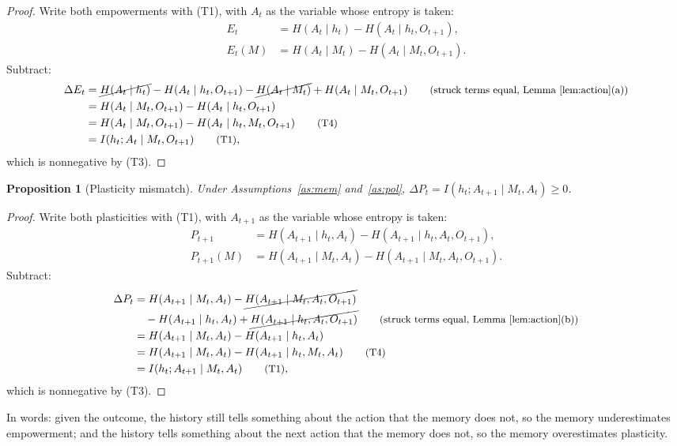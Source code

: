 \documentclass{article}
\newtheorem{proposition}{Proposition}[section]
\theoremstyle{definition}
\theoremstyle{remark}
\newcommand{\dE}{\Delta E}
\newcommand{\dP}{\Delta P}
\newcommand{\why}[1]{\tag*{\small(#1)}}
\begin{document}
\begin{proof}
Write both empowerments with (T1), with $A_t$ as the variable whose entropy is taken:
\begin{align*}
E_t&=H(A_t\mid h_t)-H(A_t\mid h_t,O_{t+1}),\\
E_t(M)&=H(A_t\mid M_t)-H(A_t\mid M_t,O_{t+1}).
\end{align*}
Subtract:
\begin{align*}
\dE_t&=\cancel{H(A_t\mid h_t)}-H(A_t\mid h_t,O_{t+1})-\cancel{H(A_t\mid M_t)}+H(A_t\mid M_t,O_{t+1}) \why{struck terms equal, Lemma~\ref{lem:action}(a)}\\
&=H(A_t\mid M_t,O_{t+1})-H(A_t\mid h_t,O_{t+1})\\
&=H(A_t\mid M_t,O_{t+1})-H(A_t\mid h_t,M_t,O_{t+1}) \why{T4}\\
&=I(h_t;A_t\mid M_t,O_{t+1}) \why{T1},
\end{align*}
which is nonnegative by (T3).
\end{proof}

\begin{proposition}[Plasticity mismatch]\label{prop:dP}
Under Assumptions~\ref{as:mem} and~\ref{as:pol}, $\dP_t=I(h_t;A_{t+1}\mid M_t,A_t)\ge0$.
\end{proposition}

\begin{proof}
Write both plasticities with (T1), with $A_{t+1}$ as the variable whose entropy is taken:
\begin{align*}
P_{t+1}&=H(A_{t+1}\mid h_t,A_t)-H(A_{t+1}\mid h_t,A_t,O_{t+1}),\\
P_{t+1}(M)&=H(A_{t+1}\mid M_t,A_t)-H(A_{t+1}\mid M_t,A_t,O_{t+1}).
\end{align*}
Subtract:
\begin{align*}
\dP_t&=H(A_{t+1}\mid M_t,A_t)-\cancel{H(A_{t+1}\mid M_t,A_t,O_{t+1})}\\
&\quad-H(A_{t+1}\mid h_t,A_t)+\cancel{H(A_{t+1}\mid h_t,A_t,O_{t+1})} \why{struck terms equal, Lemma~\ref{lem:action}(b)}\\
&=H(A_{t+1}\mid M_t,A_t)-H(A_{t+1}\mid h_t,A_t)\\
&=H(A_{t+1}\mid M_t,A_t)-H(A_{t+1}\mid h_t,M_t,A_t) \why{T4}\\
&=I(h_t;A_{t+1}\mid M_t,A_t) \why{T1},
\end{align*}
which is nonnegative by (T3).
\end{proof}

In words: given the outcome, the history still tells something about the action that the memory does not, so the memory underestimates empowerment; and the history tells something about the next action that the memory does not, so the memory overestimates plasticity.
\end{document}
